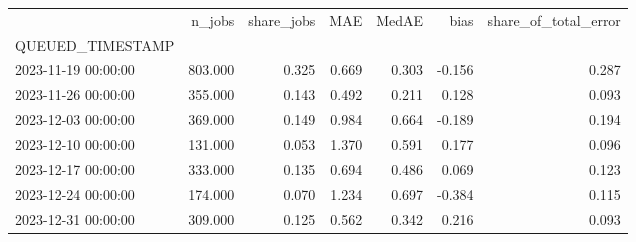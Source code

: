 \begin{tabular}{lrrrrrr}
\toprule
 & n_jobs & share_jobs & MAE & MedAE & bias & share_of_total_error \\
QUEUED_TIMESTAMP &  &  &  &  &  &  \\
\midrule
2023-11-19 00:00:00 & 803.000 & 0.325 & 0.669 & 0.303 & -0.156 & 0.287 \\
2023-11-26 00:00:00 & 355.000 & 0.143 & 0.492 & 0.211 & 0.128 & 0.093 \\
2023-12-03 00:00:00 & 369.000 & 0.149 & 0.984 & 0.664 & -0.189 & 0.194 \\
2023-12-10 00:00:00 & 131.000 & 0.053 & 1.370 & 0.591 & 0.177 & 0.096 \\
2023-12-17 00:00:00 & 333.000 & 0.135 & 0.694 & 0.486 & 0.069 & 0.123 \\
2023-12-24 00:00:00 & 174.000 & 0.070 & 1.234 & 0.697 & -0.384 & 0.115 \\
2023-12-31 00:00:00 & 309.000 & 0.125 & 0.562 & 0.342 & 0.216 & 0.093 \\
\bottomrule
\end{tabular}

